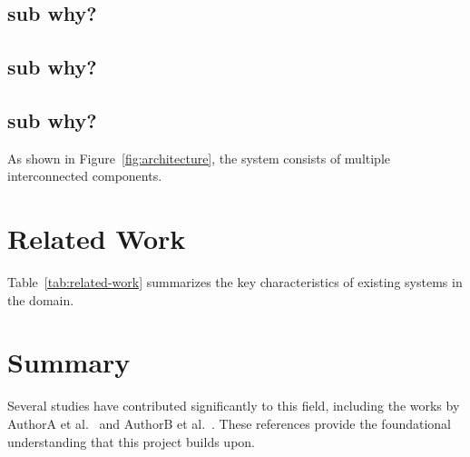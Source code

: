 \subsection{sub why?}
\label{sec:sub-why23}

\lipsum[13]

\subsection{sub why?}
\label{sec:sub-why22}

\lipsum[13]

\subsection{sub why?}
\label{sec:sub-why21}

\lipsum[13]


As shown in Figure~\ref{fig:architecture}, the system consists of multiple
interconnected components. \lipsum[14]


\section{Related Work}
\label{sec:related-work}

\lipsum[15]


Table~\ref{tab:related-work} summarizes the key characteristics of existing
systems in the domain. \lipsum[16]


\section{Summary}
\label{sec:lit-summary}

\lipsum[17]

Several studies have contributed  significantly to this field, including the
works by AuthorA et al.\  and AuthorB et al.\
. These references  provide the foundational  understanding
that this project \abbrshort{api} builds upon.
